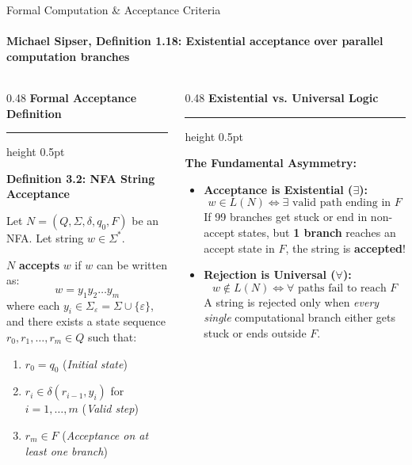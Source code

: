 \documentclass[aspectratio=169, 10pt]{beamer}
\newcommand{\colheader}[1]{%
  {\noindent\footnotesize\bfseries\color{gimpanavy}#1}%
  \vspace{0.02cm}%
  {\color{gimpanavy!30}\hrule height 0.5pt}%
  \vspace{0.05cm}%
}
\newcommand{\cardtitle}[1]{{\noindent\footnotesize\bfseries\color{gimpanavy}#1}\par\vspace{0.03cm}}
\newcommand{\greentitle}[1]{{\noindent\footnotesize\bfseries\color{accentGreen}#1}\par\vspace{0.03cm}}
\begin{document}
\begin{frame}{Formal Computation \& Acceptance Criteria}
  \framesubtitle{Michael Sipser, Definition 1.18: Existential acceptance over parallel computation branches}
  
  \begin{columns}[T]
    \begin{column}{0.48\textwidth}
      \colheader{Formal Acceptance Definition}
      \begin{tcolorbox}[conceptcard]
        \cardtitle{Definition 3.2: NFA String Acceptance}
        {\scriptsize
        Let $N = (Q, \Sigma, \delta, q_0, F)$ be an NFA. Let string $w \in \Sigma^*$.
        \vspace{0.04cm}
        
        $N$ \textbf{accepts} $w$ if $w$ can be written as:
        \[ w = y_1 y_2 \dots y_m \]
        where each $y_i \in \Sigma_\varepsilon = \Sigma \cup \{\varepsilon\}$, and there exists a state sequence $r_0, r_1, \dots, r_m \in Q$ such that:
        \begin{enumerate}\setlength{\itemsep}{1.5pt}\scriptsize
          \item $r_0 = q_0$ \quad (\textit{Initial state})
          \item $r_{i} \in \delta(r_{i-1}, y_i)$ for $i = 1, \dots, m$ \quad (\textit{Valid step})
          \item $r_m \in F$ \quad (\textit{Acceptance on at least one branch})
        \end{enumerate}
        }
      \end{tcolorbox}
    \end{column}
    
    \begin{column}{0.48\textwidth}
      \colheader{Existential vs. Universal Logic}
      \begin{tcolorbox}[examplecard]
        \greentitle{The Fundamental Asymmetry:}
        \begin{itemize}\setlength{\itemsep}{2pt}\scriptsize
          \item \textbf{Acceptance is Existential ($\exists$):}
          \[ w \in L(N) \iff \mathbf{\exists} \text{ valid path ending in } F \]
          If 99 branches get stuck or end in non-accept states, but \textbf{1 branch} reaches an accept state in $F$, the string is \textbf{accepted}!
          \item \textbf{Rejection is Universal ($\forall$):}
          \[ w \notin L(N) \iff \mathbf{\forall} \text{ paths fail to reach } F \]
          A string is rejected only when \textit{every single} computational branch either gets stuck or ends outside $F$.
        \end{itemize}
      \end{tcolorbox}
    \end{column}
  \end{columns}
  

\end{frame}
\end{document}

